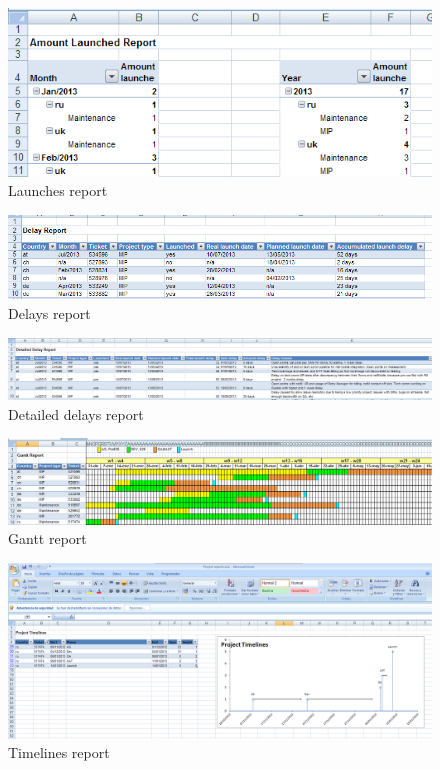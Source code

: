 \begin{figure}[ht!]
	\centering
   	\includegraphics[width=1\textwidth]{./resources/report_launches.png}
   	\caption{Launches report}
   	\label{f_report_launches}
\end{figure}
\begin{figure}[ht!]
	\centering
   	\includegraphics[width=1\textwidth]{./resources/report_delays.png}
   	\caption{Delays report}
   	\label{f_report_delays}
\end{figure}
\begin{figure}[ht!]
	\centering
   	\includegraphics[width=1\textwidth]{./resources/report_delays_detail.png}
   	\caption{Detailed delays report}
   	\label{f_report_delays_detail}
\end{figure}
\begin{figure}[ht!]
	\centering
   	\includegraphics[width=1\textwidth]{./resources/report_gantt.png}
   	\caption{Gantt report}
   	\label{f_report_gantt}
\end{figure}
\begin{figure}[ht!]
	\centering
   	\includegraphics[width=1\textwidth]{./resources/report_timelines.png}
   	\caption{Timelines report}
   	\label{f_report_timelines}
\end{figure}
